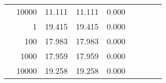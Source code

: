\begin{table}
\begin{tabular}{rrrrrrrrr}
	            
					 &  
					 
					\multirow{ 1 }{*}{ 10000 } &
					
						
							    
							    
	                           11.111 & 11.111 & 0.000  \\
	                
	            
	        
				\noalign{\smallskip}\hline
				\multirow{ 4 }{*}{ 2000000 } &
				
					
					 
					\multirow{ 1 }{*}{ 1 } &
					
						
							    
							    
	                           19.415 & 19.415 & 0.000  \\
	                
	            
					 &  
					 
					\multirow{ 1 }{*}{ 100 } &
					
						
							    
							    
	                           17.983 & 17.983 & 0.000  \\
	                
	            
					 &  
					 
					\multirow{ 1 }{*}{ 1000 } &
					
						
							    
							    
	                           17.959 & 17.959 & 0.000  \\
	                
	            
					 &  
					 
					\multirow{ 1 }{*}{ 10000 } &
					
						
							    
							    
	                           19.258 & 19.258 & 0.000  \\
	                
	            
	        

\hline

\end{tabular}
\end{table}
\clearpage


	    

